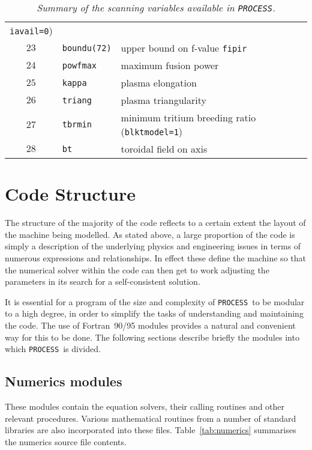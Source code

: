 \documentclass[11pt,a4paper]{report}
\newcommand{\process}{\mbox{\texttt{PROCESS}}}
\begin{document}
\begin{table}[tbph]
\begin{center}
\begin{tabular}{||c|l|l||}
\texttt{iavail=0}) \\
$23$ & \texttt{boundu(72)} & upper bound on f-value \texttt{fipir} \\
$24$ & \texttt{powfmax}    & maximum fusion power \\
$25$ & \texttt{kappa}      & plasma elongation \\
$26$ & \texttt{triang}     & plasma triangularity \\
$27$ & \texttt{tbrmin}     & minimum tritium breeding ratio (\texttt{blktmodel=1}) \\
$28$ & \texttt{bt}         & toroidal field on axis \\
\hline
\end{tabular}
\end{center}
\caption[List of scanning variables]
{\label{tab:scans}
  \textit{Summary of the scanning variables available in \process.}
}
\end{table}

\section{Code Structure}

The structure of the majority of the code reflects to a certain extent the
layout of the machine being modelled. As stated above, a large proportion of
the code is simply a description of the underlying physics and engineering
issues in terms of numerous expressions and relationships. In effect these
define the machine so that the numerical solver within the code can then get
to work adjusting the parameters in its search for a self-consistent solution.

It is essential for a program of the size and complexity of \process\ to be
modular to a high degree, in order to simplify the tasks of understanding and
maintaining the code. The use of Fortran~90/95 modules provides a natural and
convenient way for this to be done. The following sections describe briefly
the modules into which \process\ is divided.

\subsection{Numerics modules}
\label{sec:numerics_modules}

These modules contain the equation solvers, their calling routines and other
relevant procedures. Various mathematical routines from a number of standard
libraries are also incorporated into these files. Table~\ref{tab:numerics}
summarises the numerics source file contents.
\end{document}

